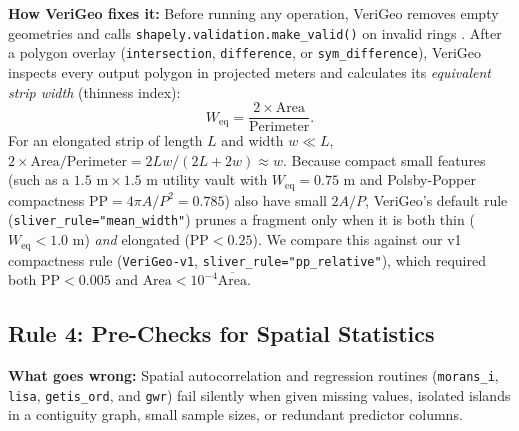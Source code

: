 \documentclass[10pt,twocolumn]{article}
\begin{document}
\textbf{How VeriGeo fixes it:} Before running any operation, VeriGeo removes empty geometries and calls \texttt{shapely.\allowbreak validation.\allowbreak make\_valid()} on invalid rings \cite{ledoux2014triangulation}. After a polygon overlay (\texttt{intersection}, \texttt{difference}, or \texttt{sym\_\allowbreak difference}), VeriGeo inspects every output polygon in projected meters and calculates its \emph{equivalent strip width} (thinness index):
\begin{equation}
  W_{\text{eq}} = \frac{2 \times \text{Area}}{\text{Perimeter}}.
\end{equation}
For an elongated strip of length $L$ and width $w \ll L$, $2 \times \text{Area} / \text{Perimeter} = 2Lw / (2L + 2w) \approx w$. Because compact small features (such as a $1.5\text{ m} \times 1.5\text{ m}$ utility vault with $W_{\text{eq}} = 0.75\text{ m}$ and Polsby-Popper compactness $\text{PP} = 4\pi A / P^2 = 0.785$) also have small $2A/P$, VeriGeo's default rule (\texttt{sliver\_rule="mean\_width"}) prunes a fragment only when it is both thin ($W_{\text{eq}} < 1.0\text{ m}$) \emph{and} elongated ($\text{PP} < 0.25$). We compare this against our v1 compactness rule (\texttt{VeriGeo-v1}, \texttt{sliver\_rule="pp\_relative"}), which required both $\text{PP} < 0.005$ and $\text{Area} < 10^{-4}\overline{\text{Area}}$.

\subsection{Rule 4: Pre-Checks for Spatial Statistics}
\textbf{What goes wrong:} Spatial autocorrelation and regression routines (\texttt{morans\_i}, \texttt{lisa}, \texttt{getis\_ord}, and \texttt{gwr}) fail silently when given missing values, isolated islands in a contiguity graph, small sample sizes, or redundant predictor columns.
\end{document}
